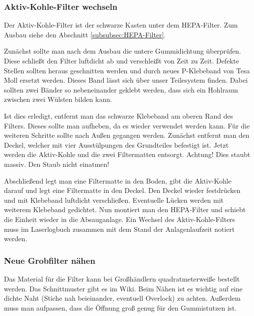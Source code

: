 \documentclass{\basedir/fablab-document}
\begin{document}
\subsubsection{Aktiv-Kohle-Filter wechseln}
Der Aktiv-Kohle-Filter ist der schwarze Kasten unter dem HEPA-Filter. Zum Ausbau siehe den Abschnitt \ref{subsubsec:HEPA-Filter}.

Zunächst sollte man nach dem Ausbau die untere Gummidichtung überprüfen. Diese schließt den Filter luftdicht ab und verschleißt von Zeit zu Zeit. Defekte Stellen sollten heraus geschnitten werden und durch neues P-Klebeband von Tesa Moll ersetzt werden. Dieses Band lässt sich über unser Teilesystem finden. Dabei sollten zwei Bänder so nebeneinander geklebt werden, dass sich ein Hohlraum zwischen zwei Wülsten bilden kann.

Ist dies erledigt, entfernt man das schwarze Klebeband am oberen Rand des Filters. Dieses sollte man aufheben, da es wieder verwendet werden kann. Für die weiteren Schritte sollte nach Außen gegangen werden. Zunächst entfernt man den Deckel, welcher mit vier Ausstülpungen des Grundteiles befestigt ist. Jetzt werden die Aktiv-Kohle und die zwei Filtermatten entsorgt. Achtung! Dies staubt massiv. Den Staub nicht einatmen!

Abschließend legt man eine Filtermatte in den Boden, gibt die Aktiv-Kohle darauf und legt eine Filtermatte in den Deckel. Den Deckel wieder festdrücken und mit Klebeband luftdicht verschließen. Eventuelle Lücken werden mit weiterem Klebeband gedichtet. Nun montiert man den HEPA-Filter und schiebt die Einheit wieder in die Absauganlage.
Ein Wechsel des Aktiv-Kohle-Filters muss im Laserlogbuch zusammen mit dem Stand der Anlagenlaufzeit notiert werden.
\subsubsection{Neue Grobfilter nähen}
Das Material für die Filter kann bei Großhändlern quadratmeterweiße bestellt werden. Das Schnittmuster gibt es im Wiki. Beim Nähen ist es wichtig auf eine dichte Naht (Stiche nah beieinander, eventuell Overlock) zu achten. Außerdem muss man aufpassen, dass die Öffnung groß genug für den Gummistutzen ist.
\end{document}
